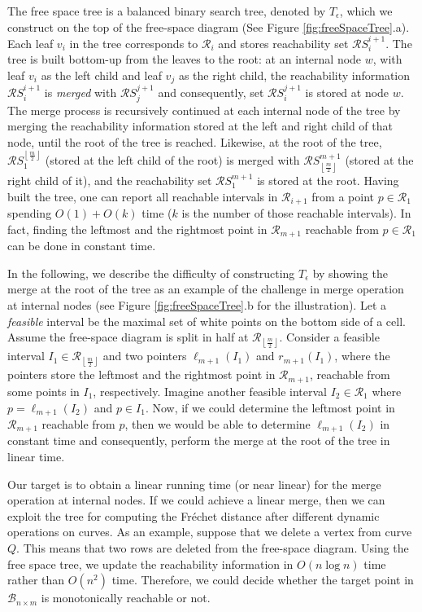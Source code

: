 \documentclass[12pt]{dalthesis}
\newcommand{\floor}[1]{{\left\lfloor{#1}\right\rfloor}}
\newcommand{\CR}{{\mathscr R}}
\newcommand{\CB}{{\mathscr B}}
\newcommand{\Frechet}{Fr\'echet }
\newcommand{\BNM}{\CB_{n \times m}}
\newcommand{\row}[1]{{\CR_{#1}}}
\newcommand{\RSet}[2]{{\mathscr RS}_{#1}^{#2}}
\begin{document}
{{The free space tree is a balanced binary search tree, denoted by $T_{\epsilon}$, 
which we construct on the top 
of the free-space diagram (See Figure \ref{fig:freeSpaceTree}.a). 
Each leaf $v_i$ in the tree corresponds to $\row{i}$ and
stores  reachability set $\RSet{i}{i+1}$.
The tree is built bottom-up from the leaves to the root:
at an internal node $w$, with leaf $v_i$ as the left child
and leaf $v_j$ as the right child, the reachability information $\RSet{i}{i+1}$
is {\em merged} with $\RSet{j}{j+1}$ and consequently, set $\RSet{i}{j+1}$
is stored at node $w$.
The merge process is recursively continued at each internal node of the tree
by merging the reachability information stored at the left and right child of 
that node, until the root of the tree is reached.
Likewise, at the root of the tree, 
$\RSet{1}{\floor{\frac{m}{2}}}$ (stored at the left child of the root) 
is  merged with $\RSet{\floor{\frac{m}{2}}}{m+1}$ (stored at the right child of it),
and the reachability set $\RSet{1}{m+1}$ is stored  at the root. 
Having built the tree, one can report all reachable intervals in $\row{i+1}$ from a point $p \in \row{1}$ spending $O(1) + O(k)$ time ($k$ is the number of those reachable intervals).
In fact, finding the leftmost and the rightmost point in $\row{m+1}$ reachable from $p \in \row{1}$ can be done in constant time.  





In the following, we describe the difficulty of constructing $T_{\epsilon}$ by showing the merge at 
the root of the tree as an example of the challenge in merge operation at internal nodes 
(see Figure \ref{fig:freeSpaceTree}.b for the illustration).
Let  a {\em feasible }interval be the maximal set of white points on the bottom side of a cell. 
Assume the free-space diagram is split in half 
at $\row{\floor{\frac{m}{2}}}$. Consider a feasible interval $I_1 \in \row{\floor{\frac{m}{2}}}$ and 
two pointers $\ell_{m+1}(I_1)$ and $r_{m+1}(I_1)$, where the pointers store the leftmost and 
the rightmost point in $\row{m+1}$, reachable from some points in $I_1$, respectively. 
Imagine another feasible interval $I_2 \in \row{1}$
where  $p = \ell_{m+1}(I_2)$ and $p \in I_1$.
Now, if we could determine the leftmost point in $\row{m+1}$ reachable from $p$, then 
we would be able to determine $\ell_{m+1}(I_2)$ in constant time
and consequently, perform the merge at the root of the tree in linear time. 

Our target is to obtain a linear running time
(or near linear) for the merge operation at internal nodes. 
If we could achieve a linear merge, then we can exploit the tree for computing 
the \Frechet distance after different dynamic operations on curves. 
As an example, suppose that we delete a vertex 
from curve $Q$. This means that two rows are deleted from the free-space diagram. 
Using the free space tree, we update the reachability information 
in $O(n \log n )$ time rather than $O(n^2)$ time. Therefore, 
we could decide whether the target point in $\BNM$ is monotonically reachable or not. 
}






}
\end{document}

